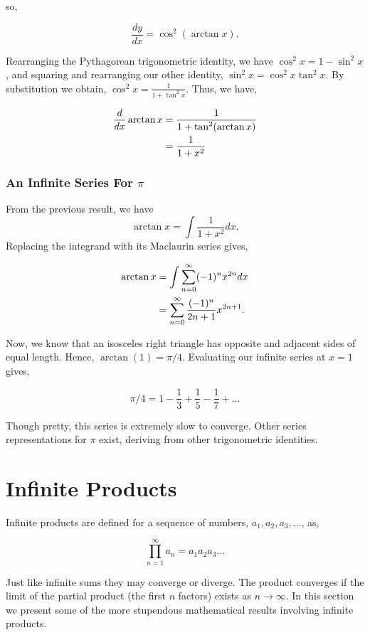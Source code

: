 \documentclass[11pt]{amsart}
\begin{document}
so,

$$\frac{dy}{dx} = \cos^2(\arctan{x}).$$

Rearranging the Pythagorean trigonometric identity, we have $\cos^2 x = 1 - \sin^2x$, and squaring and rearranging our other identity, $\sin^2{x} = \cos^2{x}\tan^2{x}$. By substitution we obtain, $\cos^2x = \frac{1}{1 + \tan^2x}$. Thus, we have,

\begin{align}
\frac{d}{dx}\arctan{x} &= \frac{1}{1 + \tan^2(\arctan{x})} \notag \\
&= \frac{1}{1 + x^2} \notag
\end{align}

\subsubsection{An Infinite Series For $\pi$}

From the previous result, we have $$\arctan{x} = \int \frac{1}{1 + x^2} dx.$$ Replacing the integrand with its Maclaurin series gives,

\begin{align}
\arctan{x} &= \int \sum_{n=0}^{\infty} (-1)^nx^{2n} dx \notag \\
&= \sum_{n=0}^{\infty} \frac{(-1)^n}{2n + 1}x^{2n+1}. \notag
\end{align}

Now, we know that an isosceles right triangle has opposite and adjacent sides of equal length. Hence, $\arctan({1}) = \pi/4$. Evaluating our infinite series at $x = 1$ gives,

$$\pi/4 = 1 - \frac{1}{3} + \frac{1}{5} - \frac{1}{7} + \dots$$

Though pretty, this series is extremely slow to converge. Other series representations for $\pi$ exist, deriving from other trigonometric identities.

\section{Infinite Products}

Infinite products are defined for a sequence of numbers, $a_1, a_2, a_3, \dots$, as,

$$\prod_{n=1}^{\infty}a_n = a_1a_2a_3\dots$$

Just like infinite sums they may converge or diverge. The product converges if the limit of the partial product (the first $n$ factors) exists as $n \to \infty$. In this section we present some of the more stupendous mathematical results involving infinite products.
\end{document}
